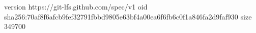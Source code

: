 version https://git-lfs.github.com/spec/v1
oid sha256:70af8f6afcb9fef32791fbbd9805e63bf4a00ea6f6fb6c0f1a846fa2d9faf930
size 349700

